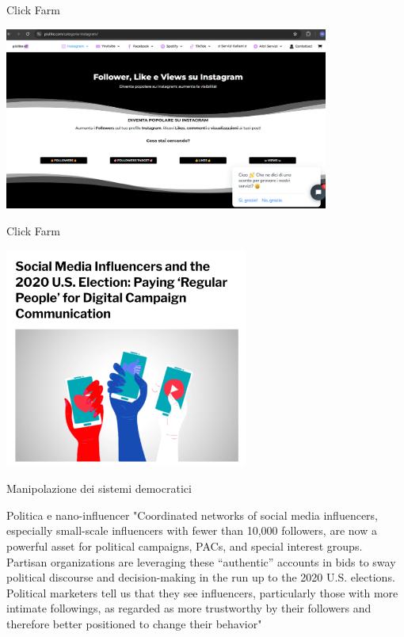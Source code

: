 \documentclass[11pt]{beamer}
\begin{document}
\begin{frame}{Click Farm }

\begin{center}
\includegraphics[width=0.8\textwidth]{Pic/compra_account_instagram_2.png}
\end{center}

\end{frame}

\begin{frame}{Click Farm \cite{social_nano}}

\begin{center}
\includegraphics[width=0.6\textwidth]{Pic/nano_influence_politics.png}
\end{center}

\end{frame}


\begin{frame}{Manipolazione dei sistemi democratici}
\begin{alertblock}{Politica e nano-influencer  \cite{social_nano}}
"Coordinated networks of social media influencers, especially small-scale influencers with fewer than 10,000 followers, are now a powerful asset for political campaigns, PACs, and special interest groups. Partisan organizations are leveraging these “authentic” accounts in bids to sway political discourse and decision-making in the run up to the 2020 U.S. elections. Political marketers tell us that they see influencers, particularly those with more intimate followings, as regarded as more trustworthy by their followers and therefore better positioned to change their behavior"
\end{alertblock}
\end{frame}
\end{document}
